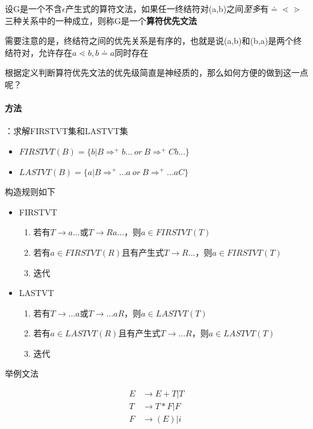 \documentclass[UTF8]{ctexart} %
\begin{document}
设G是一个不含$\epsilon$产生式的算符文法，如果任一终结符对(a,b)之间\emph{至多}有$\doteq \lessdot \gtrdot $三种关系中的一种成立，则称G是一个\textbf{算符优先文法}

需要注意的是，终结符之间的优先关系是有序的，也就是说(a,b)和(b,a)是两个终结符对，允许存在$a\lessdot b,b\doteq a$同时存在

根据定义判断算符优先文法的优先级简直是神经质的，那么如何方便的做到这一点呢？

\paragraph{方法}：求解FIRSTVT集和LASTVT集

\begin{itemize}
    \item $FIRSTVT(B)=\{b|B\Rightarrow^+b... \ or\ B\Rightarrow^+ Cb...\}$
    \item $LASTVT(B)=\{a|B\Rightarrow^+...a \ or\ B\Rightarrow^+ ...aC\}$
\end{itemize}

构造规则如下

\begin{itemize}
    \item FIRSTVT
          \begin{enumerate}
              \item 若有$T\rightarrow a...$或$T\rightarrow Ra...$，则$a\in FIRSTVT(T)$
              \item 若有$a\in FIRSTVT(R)$且有产生式$T\rightarrow R...$，则$a\in FIRSTVT(T)$
              \item 迭代
          \end{enumerate}
    \item LASTVT
          \begin{enumerate}
              \item 若有$T\rightarrow ...a$或$T\rightarrow ...aR$，则$a\in LASTVT(T)$
              \item 若有$a\in LASTVT(R)$且有产生式$T\rightarrow ...R$，则$a\in LASTVT(T)$
              \item 迭代
          \end{enumerate}
\end{itemize}

举例文法

\begin{equation}
    \begin{aligned}
        E & \rightarrow E+T|T \\
        T & \rightarrow T*F|F \\
        F & \rightarrow (E)|i
    \end{aligned}
\end{equation}
\end{document}
